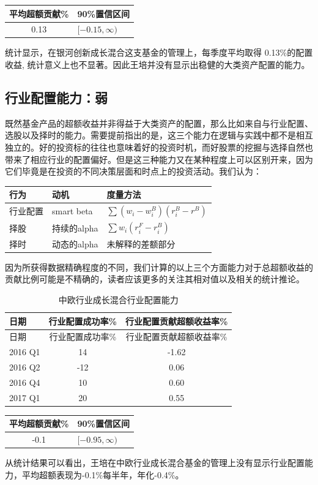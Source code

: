 \documentclass[hyperref,]{ctexart}
\begin{document}
\begin{longtable}[]{@{}cl@{}}
\toprule
平均超额贡献\% & 90\%置信区间\tabularnewline
\midrule
\endhead
0.13 & \([-0.15,\infty)\)\tabularnewline
\bottomrule
\end{longtable}

统计显示，在银河创新成长混合这支基金的管理上，每季度平均取得
0.13\%的配置收益,
统计意义上也不显著。因此王培并没有显示出稳健的大类资产配置的能力。

\subsection{行业配置能力：弱}

既然基金产品的超额收益并非得益于大类资产的配置，那么比如来自与行业配置、选股以及择时的能力。需要提前指出的是，这三个能力在逻辑与实践中都不是相互独立的。好的投资标的往往也意味着好的投资时机，而好股票的挖掘与选择自然也带来了相应行业的配置偏好。但是这三种能力又在某种程度上可以区别开来，因为它们毕竟是在投资的不同决策层面和时点上的投资活动。我们认为：

\begin{longtable}[]{@{}lll@{}}
\toprule
行为 & 动机 & 度量方法\tabularnewline
\midrule
\endhead
行业配置 & smart beta & \(\sum(w_i-w_i^B)(r_i^B-r^B)\)\tabularnewline
择股 & 持续的alpha & \(\sum w_{i}(r_{i}^F-r_{i}^B)\)\tabularnewline
择时 & 动态的alpha & 未解释的差额部分\tabularnewline
\bottomrule
\end{longtable}

因为所获得数据精确程度的不同，我们计算的以上三个方面能力对于总超额收益的贡献比例可能是不精确的，读者应该更多的关注其相对值以及相关的统计推论。

\begin{longtable}[]{@{}lcc@{}}
\caption{中欧行业成长混合行业配置能力}\tabularnewline
\toprule
日期 & 行业配置成功率\% & 行业配置贡献超额收益率\%\tabularnewline
\midrule
\endfirsthead
\toprule
日期 & 行业配置成功率\% & 行业配置贡献超额收益率\%\tabularnewline
\midrule
\endhead
2016 Q1 & 14 & -1.62\tabularnewline
2016 Q2 & -12 & 0.06\tabularnewline
2016 Q4 & 10 & 0.60\tabularnewline
2017 Q1 & 20 & 0.55\tabularnewline
\bottomrule
\end{longtable}

\begin{longtable}[]{@{}cl@{}}
\toprule
平均超额贡献\% & 90\%置信区间\tabularnewline
\midrule
\endhead
-0.1 & \([-0.95,\infty)\)\tabularnewline
\bottomrule
\end{longtable}

从统计结果可以看出，王培在中欧行业成长混合基金的管理上没有显示行业配置能力，平均超额表现为-0.1\%每半年，年化-0.4\%。
\end{document}

